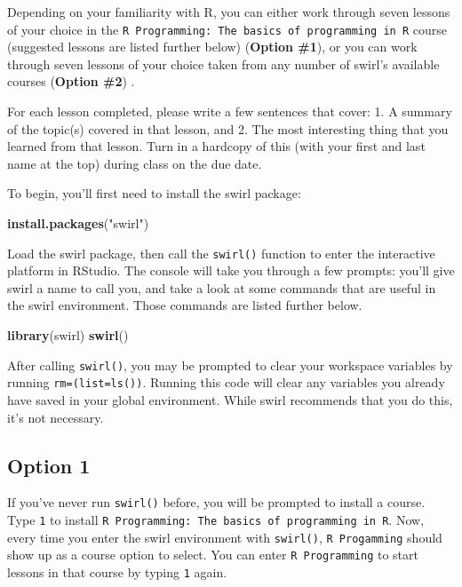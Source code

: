 \documentclass[]{book}
\makeatletter
\newenvironment{Shaded}{\begin{snugshade}}{\end{snugshade}}
\newcommand{\KeywordTok}[1]{\textcolor[rgb]{0.13,0.29,0.53}{\textbf{#1}}}
\newcommand{\StringTok}[1]{\textcolor[rgb]{0.31,0.60,0.02}{#1}}
\newcommand{\NormalTok}[1]{#1}
\newenvironment{kframe}{%
\medskip{}
\setlength{\fboxsep}{.8em}
 \def\at@end@of@kframe{}%
 \ifinner\ifhmode%
  \def\at@end@of@kframe{\end{minipage}}%
  \begin{minipage}{\columnwidth}%
 \fi\fi%
 \def\FrameCommand##1{\hskip\@totalleftmargin \hskip-\fboxsep
 \colorbox{shadecolor}{##1}\hskip-\fboxsep
     \hskip-\linewidth \hskip-\@totalleftmargin \hskip\columnwidth}%
 \MakeFramed {\advance\hsize-\width
   \@totalleftmargin\z@ \linewidth\hsize
   \@setminipage}}%
 {\par\unskip\endMakeFramed%
 \at@end@of@kframe}
\renewenvironment{Shaded}{\begin{kframe}}{\end{kframe}}
\newenvironment{rmdblock}[1]
  {
  \begin{itemize}
  \renewcommand{\labelitemi}{
    \raisebox{-.7\height}[0pt][0pt]{
      {\setkeys{Gin}{width=3em,keepaspectratio}\texttt{[image: images/\#1]}}
    }
  }
  \setlength{\fboxsep}{1em}
  \begin{kframe}
  \item
  }
  {
  \end{kframe}
  \end{itemize}
  }
\newenvironment{rmdnote}
  {\begin{rmdblock}{note}}
  {\end{rmdblock}}
\theoremstyle{definition}
\theoremstyle{definition}
\theoremstyle{definition}
\theoremstyle{remark}
\makeatother
\begin{document}
Depending on your familiarity with R, you can either work through seven
lessons of your choice in the
\texttt{R\ Programming:\ The\ basics\ of\ programming\ in\ R} course
(suggested lessons are listed further below) (\textbf{Option \#1}), or
you can work through seven lessons of your choice taken from any number
of swirl's available courses (\textbf{Option \#2}) .

For each lesson completed, please write a few sentences that cover: 1. A
summary of the topic(s) covered in that lesson, and 2. The most
interesting thing that you learned from that lesson. Turn in a hardcopy
of this (with your first and last name at the top) during class on the
due date.

To begin, you'll first need to install the swirl package:

\begin{Shaded}
\begin{Highlighting}[]
\KeywordTok{install.packages}\NormalTok{(}\StringTok{"swirl"}\NormalTok{)}
\end{Highlighting}
\end{Shaded}

Load the swirl package, then call the \texttt{swirl()} function to enter
the interactive platform in RStudio. The console will take you through a
few prompts: you'll give swirl a name to call you, and take a look at
some commands that are useful in the swirl environment. Those commands
are listed further below.

\begin{Shaded}
\begin{Highlighting}[]
\KeywordTok{library}\NormalTok{(swirl)}
\KeywordTok{swirl}\NormalTok{()}
\end{Highlighting}
\end{Shaded}

\begin{rmdnote}
After calling \texttt{swirl()}, you may be prompted to clear your
workspace variables by running \texttt{rm=(list=ls())}. Running this
code will clear any variables you already have saved in your global
environment. While swirl recommends that you do this, it's not
necessary.
\end{rmdnote}

\subsection{Option 1}\label{option-1}

If you've never run \texttt{swirl()} before, you will be prompted to
install a course. Type \texttt{1} to install
\texttt{R\ Programming:\ The\ basics\ of\ programming\ in\ R}. Now,
every time you enter the swirl environment with \texttt{swirl()},
\texttt{R\ Progamming} should show up as a course option to select. You
can enter \texttt{R\ Programming} to start lessons in that course by
typing \texttt{1} again.
\end{document}
